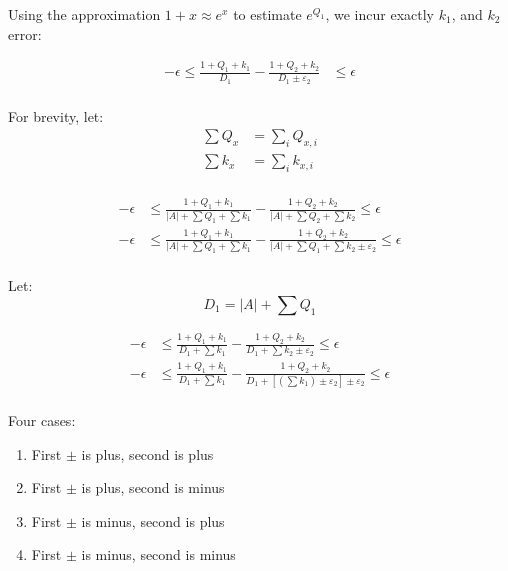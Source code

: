 \documentclass[11pt]{amsart}
\begin{document}
Using the approximation $1 + x \approx e^x$ to estimate $e^{Q_1}$, we incur exactly $k_1$, and $k_2$ error:

\begin{align*}
- \epsilon \leq \frac{1 + Q_1 + k_1}{D_1} - \frac{1 + Q_2 + k_2}{D_1 \pm \varepsilon_2} &\leq \epsilon \\
\end{align*}







For brevity, let:
\begin{align*}
\sum Q_x &= \sum_i Q_{x,i} \\
\sum k_x &= \sum_i k_{x,i} \\
\end{align*}

\begin{align*}
-\epsilon &\leq \frac{1 + Q_1 + k_1}{|A| + \sum Q_1 +  \sum k_1} - \frac{1 + Q_2 + k_2}{|A| + \sum Q_2 + \sum k_2}  \leq \epsilon \\
-\epsilon &\leq \frac{1 + Q_1 + k_1}{|A| + \sum Q_1 +  \sum k_1} - \frac{1 + Q_2 + k_2}{|A| + \sum Q_1 + \sum k_2 \pm \varepsilon_2}  \leq \epsilon \\
\end{align*}

Let:
\begin{equation*}
D_1 = |A| + \sum Q_1
\end{equation*}

\begin{align*}
-\epsilon &\leq \frac{1 + Q_1 + k_1}{D_1 +  \sum k_1} - \frac{1 + Q_2 + k_2}{D_1 + \sum k_2 \pm \varepsilon_2}  \leq \epsilon \\
-\epsilon &\leq \frac{1 + Q_1 + k_1}{D_1 +  \sum k_1} - \frac{1 + Q_2 + k_2}{D_1 + \left[ \left(\sum k_1\right) \pm \varepsilon_2\right] \pm \varepsilon_2}  \leq \epsilon \\
\end{align*}

Four cases:
\begin{enumerate}
\item First $\pm$ is plus, second is plus
\item First $\pm$ is plus, second is minus
\item First $\pm$ is minus, second is plus
\item First $\pm$ is minus, second is minus
\end{enumerate}
\end{document}
